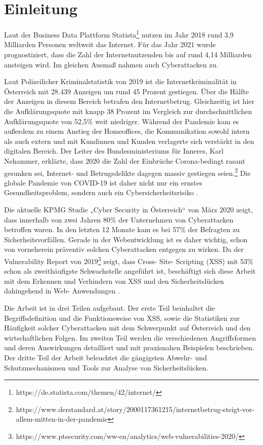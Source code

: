 \section{Einleitung}
\label{section:Einleitung}

Laut der Business Data Plattform Statista\footnote{https://de.statista.com/themen/42/internet/} nutzen im Jahr 2018 rund 3,9 Milliarden Personen weltweit das Internet. Für das Jahr 2021 wurde prognostiziert, dass die Zahl der Internetnutzenden bis auf rund 4,14 Milliarden ansteigen wird. Im gleichen Ausmaß nahmen auch Cyberattacken zu.

Laut Polizeilicher Kriminalstatistik von 2019 ist die Internetkriminalität in Österreich mit 28.439 Anzeigen um rund 45 Prozent gestiegen. Über die Hälfte der Anzeigen in diesem Bereich betrafen den Internetbetrug. Gleichzeitig ist hier die Aufklärungsquote mit knapp 38 Prozent im Vergleich zur durchschnittlichen Aufklärungsquote von 52,5\% weit niedriger. Während der Pandemie kam es außerdem zu einem Anstieg der Homeoffices, die Kommunikation sowohl intern als auch extern und mit Kundinnen und Kunden verlagerte sich verstärkt in den digitalen Bereich.  Der Leiter des Bundesministeriums für Inneres, Karl Nehammer, erklärte, dass 2020 die Zahl der Einbrüche Corona-bedingt rasant gesunken sei, Internet- und Betrugsdelikte dagegen massiv gestiegen seien.\footnote{https://www.derstandard.at/story/2000117361215/internetbetrug-steigt-vor-allem-mitten-in-der-pandemie}
Die globale Pandemie von COVID-19 ist daher nicht nur ein ernstes Gesundheitsproblem, sondern auch ein Cybersicherheitsrisiko \autocite[12-17]{bundeskriminalamt2020}.

Die aktuelle KPMG Studie „Cyber Security in Österreich“ von März 2020 zeigt, dass innerhalb von zwei Jahren 80\% der Unternehmen von Cyberattacken betroffen waren. In den letzten 12 Monate kam es bei 57\% der Befragten zu Sicherheitsvorfällen. Gerade in der Webentwicklung ist es daher wichtig, schon von vorneherein präventiv solchen Cyberattacken entgegen zu wirken. Da der Vulnerability Report von 2019\footnote{https://www.ptsecurity.com/ww-en/analytics/web-vulnerabilities-2020/} zeigt, dass Cross- Site- Scripting (XSS) mit 53\% schon als zweithäufigste Schwachstelle angeführt ist, beschäftigt sich diese Arbeit mit dem Erkennen und Verhindern von XSS und den Sicherheitslücken dahingehend in Web- Anwendungen \autocite[10-13]{kpmg2020}.

Die Arbeit ist in drei Teilen aufgebaut. Der erste Teil beinhaltet die Begriffsdefinition und die Funktionsweise von XSS, sowie die Statistiken zur Häufigkeit solcher Cyberattacken mit dem Schwerpunkt auf Österreich und den wirtschaftlichen Folgen. Im zweiten Teil werden die verschiedenen Angriffsformen und deren Auswirkungen detailliert und mit praxisnahen Beispielen beschrieben. Der dritte Teil der Arbeit beleuchtet die gängigsten Abwehr- und Schutzmechanismen und Tools zur Analyse von Sicherheitslücken.


